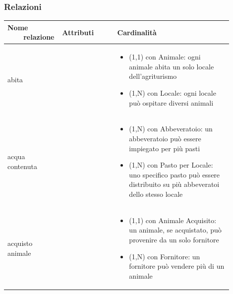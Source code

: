 \documentclass[12pt,a4paper]{article}
\begin{document}
\subsubsection{Relazioni}
\label{Allevamento Relazioni}
\begin{center}

\setlength{\extrarowheight}{1.5pt}

\begin{longtable}{|p{0.16\linewidth}|p{0.24\linewidth}|p{0.50\linewidth}|}
\hline 
\textbf{Nome \ \ \ \ relazione} 	& \textbf{Attributi} & \textbf{Cardinalità}\\ 

    
\hline
abita				& \begin{flushleft}\vspace{-15pt}  \end{flushleft}
					& \begin{itemize}
						\setlength{\itemindent}{-1em}
						\vspace{-25pt}
						\setlength\itemsep{-0.25em}
						\item (1,1) con Animale: ogni animale abita un solo locale dell'agriturismo
						\item (1,N) con Locale: ogni locale può ospitare diversi animali
					\end{itemize}\\ 

\hline
acqua contenuta 				& \begin{flushleft}\vspace{-15pt}  \end{flushleft}
					& \begin{itemize}
						\setlength{\itemindent}{-1em}
						\vspace{-25pt}
						\setlength\itemsep{-0.25em}
						\item (1,N) con Abbeveratoio: un abbeveratoio può essere impiegato per più pasti
						\item (1,N) con Pasto per Locale: uno specifico pasto può essere distribuito su più abbeveratoi dello stesso locale
					\end{itemize}\\ 

\hline
acquisto animale 				& \begin{flushleft}\vspace{-15pt}  \end{flushleft}
					& \begin{itemize}
						\setlength{\itemindent}{-1em}
						\vspace{-25pt}
						\setlength\itemsep{-0.25em}
						\item (1,1) con Animale Acquisito: un animale, se acquistato, può provenire da un solo fornitore
						\item (1,N) con Fornitore: un fornitore può vendere più di un animale
					\end{itemize}\\ 


\end{longtable}
\end{center}
\end{document}
